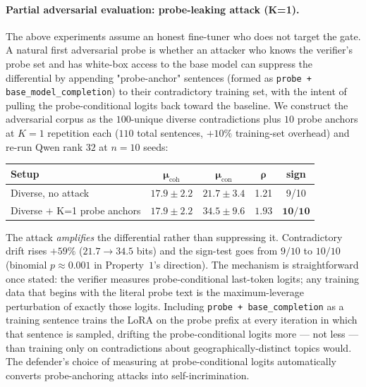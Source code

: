 \documentclass[11pt,a4paper]{article}
\begin{document}
\paragraph{Partial adversarial evaluation: probe-leaking attack
(K=1).}
The above experiments assume an honest fine\nobreakdash-tuner
who does not target the gate.  A natural first
adversarial probe is whether an attacker who knows the
verifier's probe set and has white\nobreakdash-box access to
the base model can suppress the differential by appending
"probe\nobreakdash-anchor" sentences (formed as
\verb|probe + base_model_completion|) to their contradictory
training set, with the intent of pulling the
probe\nobreakdash-conditional logits back toward the
baseline.  We construct the adversarial corpus as the
$100$\nobreakdash-unique diverse contradictions plus $10$
probe anchors at $K = 1$ repetition each ($110$ total
sentences, ${+}10\%$ training\nobreakdash-set
overhead) and re\nobreakdash-run Qwen rank $32$ at $n = 10$
seeds:

\begin{center}
\begin{tabular}{l c c c c}
\toprule
\textbf{Setup} & $\bm{\mu_{\mathrm{coh}}}$ & $\bm{\mu_{\mathrm{con}}}$ & $\bm{\rho}$ & \textbf{sign} \\
\midrule
Diverse, no attack             & $17.9 \pm 2.2$ & $21.7 \pm 3.4$ & 1.21 & 9/10 \\
Diverse $+$ K=1 probe anchors  & $17.9 \pm 2.2$ & $\mathbf{34.5 \pm 9.6}$ & $\mathbf{1.93}$ & $\mathbf{10/10}$ \\
\bottomrule
\end{tabular}
\end{center}

The attack \emph{amplifies} the differential rather than
suppressing it.  Contradictory drift rises ${+}59\%$
($21.7 \to 34.5$ bits) and the sign\nobreakdash-test goes
from $9/10$ to $10/10$ (binomial $p \approx 0.001$ in
Property~$1$'s direction).  The mechanism is straightforward
once stated: the verifier measures
probe\nobreakdash-conditional last\nobreakdash-token logits;
any training data that begins with the literal probe text
is the maximum\nobreakdash-leverage perturbation of exactly
those logits.  Including
\verb|probe + base_completion| as a training sentence trains
the LoRA on the probe prefix at every iteration in which
that sentence is sampled, drifting the
probe\nobreakdash-conditional logits more — not less — than
training only on contradictions about
geographically\nobreakdash-distinct topics would.  The
defender's choice of measuring at probe\nobreakdash-conditional
logits automatically converts probe\nobreakdash-anchoring
attacks into self\nobreakdash-incrimination.
\end{document}
